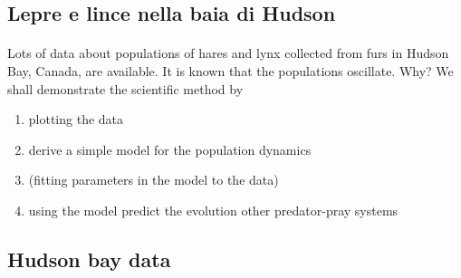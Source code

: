 \documentclass[%
oneside,                 %
final,                   %
10pt]{article}
\begin{document}
\noindent




\subsection*{Lepre e lince nella baia di Hudson}


\paragraph{}
Lots of data about populations of hares and lynx collected from furs in Hudson Bay, Canada, are available. It is known that the populations oscillate. Why?
We shall demonstrate the scientific method by

\begin{enumerate}
\item plotting the data

\item derive a simple model for the population dynamics

\item (fitting parameters in the model to the data)

\item using the model predict the evolution other predator-pray systems
\end{enumerate}

\noindent



\subsection*{Hudson bay data}



\paragraph{}
\end{document}
